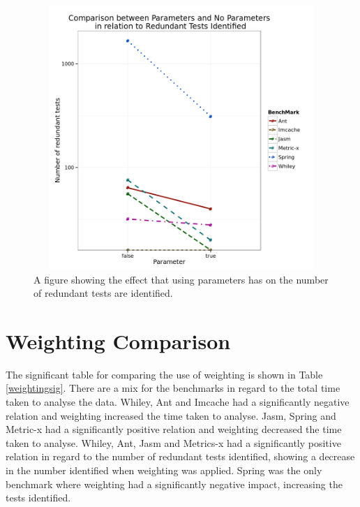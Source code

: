 \begin{figure}[h]
\begin{center}
\includegraphics[height=10cm, width = 14.5cm]{Parameters.png}
\end{center}
\caption{A figure showing the effect that using parameters has on the number of redundant tests are identified.}
\label{fig:paramgraph}
\end{figure}

\section{Weighting Comparison}

The significant table for comparing the use of weighting is shown in Table \ref{weightingsig}. There are a mix for the benchmarks in regard to the total time taken to analyse the data. Whiley, Ant and Imcache had a significantly negative relation and weighting increased the time taken to analyse. Jasm, Spring and Metric-x had a significantly positive relation and weighting decreased the time taken to analyse. Whiley, Ant, Jasm and Metrics-x had a significantly positive relation in regard to the number of redundant tests identified, showing a decrease in the number identified when weighting was applied. Spring was the only benchmark where weighting had a significantly negative impact, increasing the tests identified.

